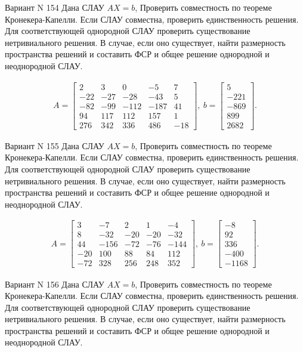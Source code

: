 \documentclass[11pt]{report}
\begin{document}
Вариант N 154
Дана СЛАУ $AX = b$,
Проверить совместность по теореме Кронекера-Капелли. Если СЛАУ совместна, проверить единственность решения.
Для соответствующей однородной СЛАУ проверить существование нетривиального решения. В случае, если оно существует,
найти размерность пространства решений и составить ФСР и общее решение однородной  и неоднородной СЛАУ.


\begin{align*}
 A = \left[\begin{matrix}2 & 3 & 0 & -5 & 7\\-22 & -27 & -28 & -43 & 5\\-82 & -99 & -112 & -187 & 41\\94 & 117 & 112 & 157 & 1\\276 & 342 & 336 & 486 & -18\end{matrix}\right],
\ b = \left[\begin{matrix}5\\-221\\-869\\899\\2682\end{matrix}\right]. 
 \end{align*}

Вариант N 155
Дана СЛАУ $AX = b$,
Проверить совместность по теореме Кронекера-Капелли. Если СЛАУ совместна, проверить единственность решения.
Для соответствующей однородной СЛАУ проверить существование нетривиального решения. В случае, если оно существует,
найти размерность пространства решений и составить ФСР и общее решение однородной  и неоднородной СЛАУ.


\begin{align*}
 A = \left[\begin{matrix}3 & -7 & 2 & 1 & -4\\8 & -32 & -20 & -20 & -32\\44 & -156 & -72 & -76 & -144\\-20 & 100 & 88 & 84 & 112\\-72 & 328 & 256 & 248 & 352\end{matrix}\right],
\ b = \left[\begin{matrix}-8\\92\\336\\-400\\-1168\end{matrix}\right]. 
 \end{align*}

Вариант N 156
Дана СЛАУ $AX = b$,
Проверить совместность по теореме Кронекера-Капелли. Если СЛАУ совместна, проверить единственность решения.
Для соответствующей однородной СЛАУ проверить существование нетривиального решения. В случае, если оно существует,
найти размерность пространства решений и составить ФСР и общее решение однородной  и неоднородной СЛАУ.
\end{document}
